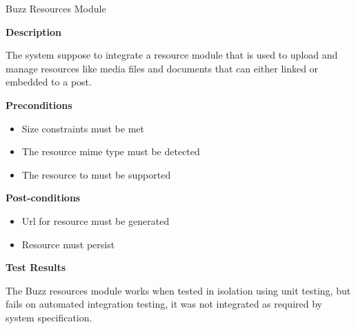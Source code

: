 \item Buzz Resources Module

\textbf{Description}
	
The system suppose to integrate a resource module that is used to upload and manage resources like media files and documents that can either linked or embedded to a post.
	
\textbf{Preconditions}
\begin{itemize}
	\item Size constraints must be met
	\item The resource mime type must be detected
	\item The resource to must be supported
\end{itemize}

\textbf{Post-conditions}
\begin{itemize}
\item Url for resource must be generated
\item Resource must persist
\end{itemize}

\textbf{Test Results}

The Buzz resources module works when tested in isolation using unit testing, but fails on automated integration testing, it was not integrated as required by system specification. 



		 		 